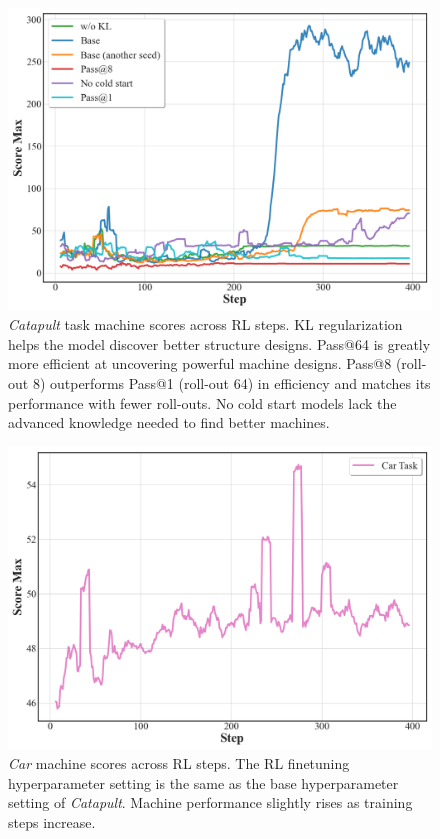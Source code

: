     

\begin{figure}[h!]
  \centering
  \includegraphics[width=0.5\linewidth]{figures/RL_Metrics/Catapult/score_max.png}
  \caption{\footnotesize \textit{Catapult} task machine scores across RL steps. KL regularization helps the model discover better structure designs. Pass@64 is greatly more efficient at uncovering powerful machine designs. Pass@8 (roll-out 8) outperforms Pass@1 (roll-out 64) in efficiency and matches its performance with fewer roll-outs. No cold start models lack the advanced knowledge needed to find better machines.} \label{fig:RL-catapult-max-score}
\end{figure}

\begin{figure}[h!]
    \centering
    \includegraphics[width=.5\linewidth]{figures/RL_Metrics/Car/score_max.png}
    \caption{\footnotesize \textit{Car} machine scores across RL steps. The RL finetuning hyperparameter setting is the same as the base hyperparameter setting of \textit{Catapult}. Machine performance slightly rises as training steps increase.}
    \label{fig:RL-car-max-score}
\end{figure}


